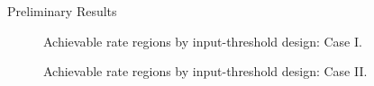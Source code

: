 \documentclass[journal]{IEEEtran}
\begin{document}
\begin{section}{Preliminary Results}
	\begin{figure}[!t]
		\centering
		\caption{Achievable rate regions by input-threshold design: Case I.}
		\label{fi:rate_region_1}
	\end{figure}

	\begin{figure}[!t]
		\centering
		\caption{Achievable rate regions by input-threshold design: Case II.}
		\label{fi:rate_region_2}
	\end{figure}
\end{section}
\end{document}
